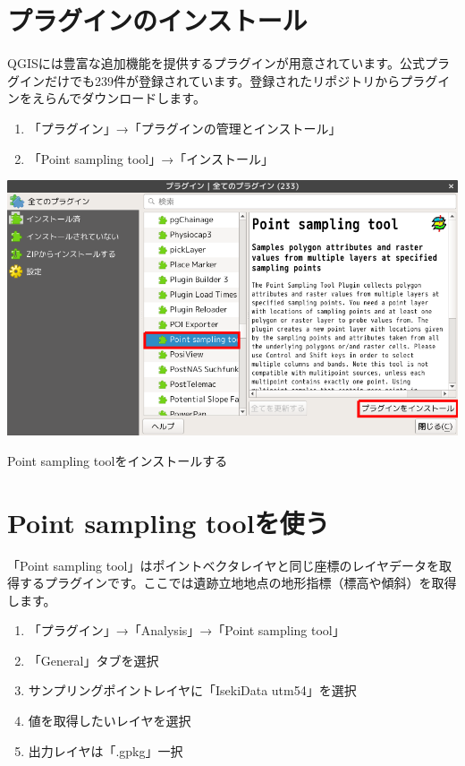 \documentclass[14Q,twocolumn]{jsarticle}
\makeatletter
\newenvironment{figurehere}
  {\def\@captype{figure}}
  {}
\makeatother
\begin{document}
\section{プラグインのインストール}
QGISには豊富な追加機能を提供するプラグインが用意されています。公式プラグインだけでも239件が登録されています。登録されたリポジトリからプラグインをえらんでダウンロードします。

\begin{enumerate}
\item 「プラグイン」→「プラグインの管理とインストール」
\item 「Point sampling tool」→「インストール」
\end{enumerate}

\begin{figurehere}
\centering
\includegraphics[width=0.8\linewidth]{04.png}
\caption{Point sampling toolをインストールする}
\end{figurehere}

\section{Point sampling toolを使う}
「Point sampling tool」はポイントベクタレイヤと同じ座標のレイヤデータを取得するプラグインです。ここでは遺跡立地地点の地形指標（標高や傾斜）を取得します。

\begin{enumerate}
\item 「プラグイン」→「Analysis」→「Point sampling tool」
\item 「General」タブを選択
\item サンプリングポイントレイヤに「IsekiData utm54」を選択
\item 値を取得したいレイヤを選択
\item 出力レイヤは「.gpkg」一択
\end{enumerate}
\end{document}
